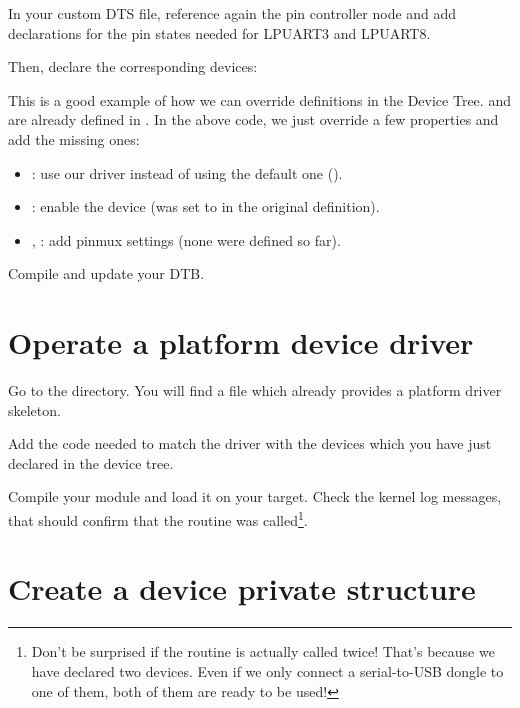 {\scriptsize {}}

In your custom DTS file, reference again the pin controller node and add
declarations for the pin states needed for LPUART3 and LPUART8.

Then, declare the corresponding devices:

{\scriptsize {}}

This is a good example of how we can override definitions in the Device
Tree.  and  are already defined in
. In the above code, we
just override a few properties and add the missing ones:

\begin{itemize}
\item {}: use our driver instead of using the default one
      ().
\item {}: enable the device (was set to  in
      the original definition).
\item {}, : add pinmux settings
      (none were defined so far).
\end{itemize}

Compile and update your DTB.

\section{Operate a platform device driver}

Go to the 
directory. You will find a  file which already provides
a platform driver skeleton.

Add the code needed to match the driver with the devices which you have
just declared in the device tree.

Compile your module and load it on your target. Check the kernel log
messages, that should confirm that the  routine was
called\footnote{Don't be surprised if the  routine is
actually called twice! That's because we have declared two devices.
Even if we only connect a serial-to-USB dongle to one of them, both
of them are ready to be used!}.

\section{Create a device private structure}

